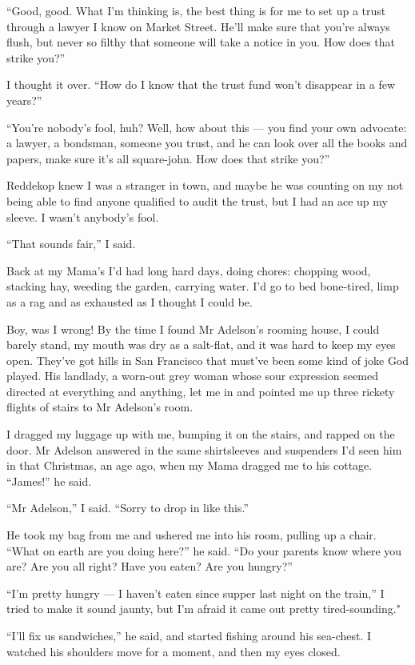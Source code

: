 ``Good, good. What I'm thinking is, the best thing is for me to set up a trust 
through a lawyer I know on Market Street. He'll make sure that you're always 
flush, but never so filthy that someone will take a notice in you. How does 
that strike you?''

I thought it over.
``How do I know that the trust fund won't disappear in a few years?''

``You're nobody's fool, huh? Well, how about this --- you find your own 
advocate: a lawyer, a bondsman, someone you trust, and he can look over all the 
books and papers, make sure it's all square-john. How does that strike you?''

Reddekop knew I was a stranger in town, and maybe he was counting
on my not being able to find anyone qualified to audit the trust,
but I had an ace up my sleeve. I wasn't anybody's fool.

``That sounds fair,'' I said.

\tb

Back at my Mama's I'd had long hard days, doing chores: chopping
wood, stacking hay, weeding the garden, carrying water. I'd go to
bed bone-tired, limp as a rag and as exhausted as I thought I could
be.

Boy, was I wrong! By the time I found Mr Adelson's rooming house, I
could barely stand, my mouth was dry as a salt-flat, and it was
hard to keep my eyes open. They've got hills in San Francisco that
must've been some kind of joke God played. His landlady, a worn-out
grey woman whose sour expression seemed directed at everything and
anything, let me in and pointed me up three rickety flights of
stairs to Mr Adelson's room.

I dragged my luggage up with me, bumping it on the stairs, and
rapped on the door. Mr Adelson answered in the same shirtsleeves
and suspenders I'd seen him in that Christmas, an age ago, when my
Mama dragged me to his cottage. ``James!'' he said.

``Mr Adelson,'' I said. ``Sorry to drop in like this.''

He took my bag from me and ushered me into his room, pulling up a
chair. ``What on earth are you doing here?'' he said.
``Do your parents know where you are? Are you all right? Have you eaten? Are 
you hungry?''

``I'm pretty hungry --- I haven't eaten since supper last night on the train,''
I tried to make it sound jaunty, but I'm afraid it came out pretty
tired-sounding."

``I'll fix us sandwiches,'' he said, and started fishing around his
sea-chest. I watched his shoulders move for a moment, and then my
eyes closed.

